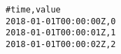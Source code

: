\begin{verbatim}
#time,value
2018-01-01T00:00:00Z,0
2018-01-01T00:00:01Z,1
2018-01-01T00:00:02Z,2
\end{verbatim}
